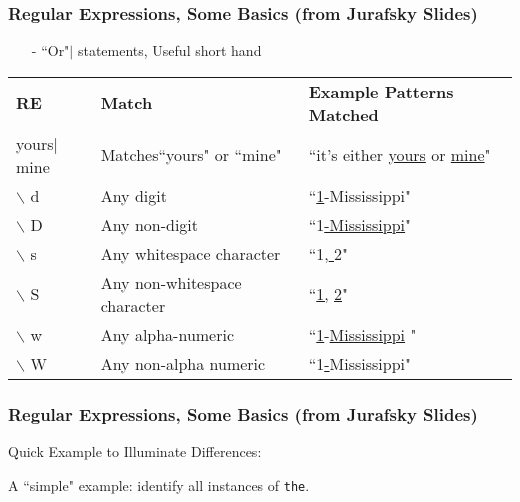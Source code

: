 \documentclass{beamer}
\numberwithin{equation}{section}
\begin{document}
\begin{frame}
\frametitle{Regular Expressions, Some Basics (from Jurafsky Slides) } 

\begin{itemize}
\item[-] ``Or"$|$ statements, Useful short hand 
\end{itemize}
\begin{center}
\begin{tabular}{lll}
\textbf{RE} & \textbf{Match} & \textbf{Example Patterns Matched}\\
yours$|$mine & Matches``yours" or ``mine" & ``it's either \underline{yours} or \underline{mine}"\\
$\backslash$ d  & Any digit  & ``\underline{1}-Mississippi" \\
$\backslash$ D  & Any non-digit & ``1\underline{-Mississippi}" \\
$\backslash$ s & Any whitespace character & ``1,\underline{ }2"\\
$\backslash$ S & Any non-whitespace character & ``\underline{1,} \underline{2}" \\
$\backslash$ w & Any alpha-numeric  &  ``\underline{1}-\underline{Mississippi} " \\
$\backslash$ W & Any non-alpha numeric & ``1\underline{-}Mississippi"  \\
\end{tabular}
\end{center}
\end{frame}



\begin{frame}
\frametitle{Regular Expressions, Some Basics (from Jurafsky Slides) } 
Quick Example to Illuminate Differences: 


A ``simple" example: identify all instances of \alert{{\tt the}}. \pause 


\begin{itemize}
 \pause 
{} \pause 
{} \pause 
{} \pause 
{} \pause 
{} \pause 
{} 
\end{itemize}

\end{frame}
\end{document}
